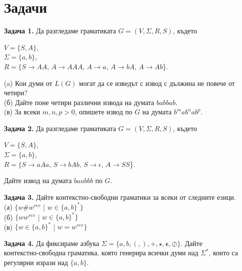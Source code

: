 \documentclass{article}
\newcommand{\bleft}{
    \boldsymbol{\left(\right.}
}
\newcommand{\bright}{
    \boldsymbol{\left.\right)}
}
\newcommand{\bplus}{
    \boldsymbol{+}
}
\newcommand{\bepsilon}{
    \boldsymbol{\epsilon}
}
\begin{document}
\section{Задачи}
    \textbf{Задача 1.} Да разгледаме граматиката $G = (V,\Sigma,R,S)$, където
    \vspace{5pt}
    \begin{center}
        $V = \{S,A\}$, \\
        $\Sigma = \{a,b\}$, \\
        $R = \{S \rightarrow AA$, $A \rightarrow AAA$, $A \rightarrow a$, $A \rightarrow bA$, $A \rightarrow Ab$\}. \\
    \end{center}
    \vspace{5pt}
    (a) Кои думи от $L(G)$ могат да се изведът с извод с дължина не повече от четири? \\
    (б) Дайте поне четири различни извода на думата $babbab$. \\
    (в) За всеки $m,n,p > 0$, опишете извод по $G$ на думата $b^mab^nab^p$. 

    \vspace{50pt}

    \textbf{Задача 2.} Да разгледаме граматиката $G = (V,\Sigma,R,S)$, където
    \vspace{5pt}
    \begin{center}
        $V = \{S,A\}$, \\
        $\Sigma = \{a,b\}$, \\
        $R = \{S \rightarrow aAa$, $S \rightarrow bAb$, $S \rightarrow \epsilon$, $A \rightarrow SS$\}. \\
    \end{center}
    Дайте извод на думата $baabbb$ по $G$.

    \vspace{15pt}

    \textbf{Задача 3.} Дайте контекстно-свободни граматики за всеки от следните езици. \\
    (а) $\{w\#w^{rev}$ | $w \in \{a,b\}^*\}$ \\
    (б) $\{ww^{rev}$ | $w \in \{a,b\}^*\}$ \\
    (в) $\{w \in \{a,b\}^*$ | $w = w^{rev}\}$

    \vspace{15pt}

    \textbf{Задача 4.} Да фиксираме азбука $\Sigma = \{a,b,\bleft,\bright,\bplus,\star,\bepsilon,\oslash\}$.
    Дайте \\ контекстно-свободна граматика, която генерира всички думи над $\Sigma^*$, които са регулярни изрази
    над $\{a,b\}$.
\end{document}
